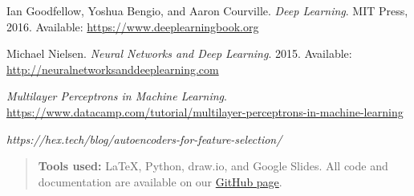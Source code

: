 \begin{thebibliography}{9}

Ian Goodfellow, Yoshua Bengio, and Aaron Courville. 
\textit{Deep Learning}. 
MIT Press, 2016. Available: \url{https://www.deeplearningbook.org}

Michael Nielsen. 
\textit{Neural Networks and Deep Learning}. 
2015. Available: \url{http://neuralnetworksanddeeplearning.com}

\textit{Multilayer Perceptrons in Machine Learning}.  \url{https://www.datacamp.com/tutorial/multilayer-perceptrons-in-machine-learning}

\textit{https://hex.tech/blog/autoencoders-for-feature-selection/}
\end{thebibliography}




\noindent\begin{quote}
    \textbf{Tools used:} LaTeX, Python, draw.io, and Google Slides. All code and documentation are available on our \href{https://github.com/eljesa-kqiku/machine-learning-seminar-project}{GitHub page}.
    \end{quote}
    